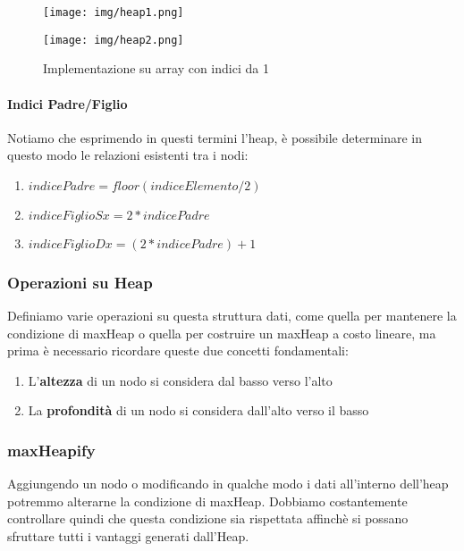 \documentclass{article}
\begin{document}
\begin{figure}[htbp]
        \center
        \texttt{[image: img/heap1.png]}
    \end{figure}

\begin{figure}[htbp]
        \center
        \texttt{[image: img/heap2.png]}
        \caption{Implementazione su array con indici da 1}
    \end{figure}

\paragraph{Indici Padre/Figlio} Notiamo che esprimendo in questi termini l'heap, è possibile determinare in questo modo le relazioni esistenti tra i nodi:

\begin{enumerate}
    \item $indicePadre = floor(indiceElemento/2)$
    \item $indiceFiglioSx = 2*indicePadre$
    \item $indiceFiglioDx = (2*indicePadre)+1$
\end{enumerate}

\newpage

\subsubsection{Operazioni su Heap} Definiamo varie operazioni su questa struttura dati, come quella per mantenere la condizione di maxHeap o quella per costruire un maxHeap a costo lineare, ma prima è necessario ricordare queste due concetti fondamentali:

\begin{enumerate}
    \item L'\textbf{altezza} di un nodo si considera dal basso verso l'alto
    \item La \textbf{profondità} di un nodo si considera dall'alto verso il basso
\end{enumerate}

\subsubsection{maxHeapify} Aggiungendo un nodo o modificando in qualche modo i dati all'interno dell'heap potremmo alterarne la condizione di maxHeap. Dobbiamo costantemente controllare quindi che questa condizione sia rispettata affinchè si possano sfruttare tutti i vantaggi generati dall'Heap.
\end{document}
